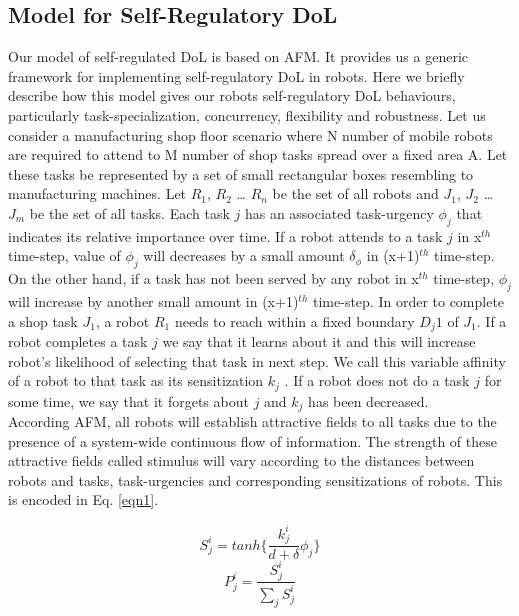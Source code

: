 \documentclass{llncs}
\begin{document}
\subsection{Model for Self-Regulatory DoL}
Our model of self-regulated DoL is based on AFM. It provides us a generic framework for implementing self-regulatory DoL in robots. Here we briefly describe how this model gives our robots self-regulatory DoL behaviours, particularly task-specialization, concurrency, flexibility and robustness.
Let us consider a manufacturing shop floor scenario where N number of mobile robots are required to attend to M number of shop tasks spread over a fixed area A. Let these tasks be represented by a set of small rectangular boxes resembling to manufacturing machines. Let $R_1$, $R_2$ … $R_n$ be the set of all robots and $J_1$, $J_2$ … $J_m$ be the set of all tasks. Each task $j$ has an associated task-urgency $\phi_j$ that indicates its relative importance over time. If a robot attends to a task $j$ in x$^{th}$ time-step, value of $\phi_j$ will decreases by a small amount $\delta_\phi$ in (x+1)$^{th}$ time-step. On the other hand, if a task has not been served by any robot in x$^{th}$ time-step,  $\phi_j$  will increase by another small amount in (x+1)$^{th}$ time-step. In order to complete a shop task $J_1$, a robot $R_1$ needs to reach within a fixed boundary $D_j1$ of $J_1$. If a robot completes a task $j$ we say that it learns about it and this will increase robot's likelihood of selecting that task in next step. We call this variable affinity of a robot to that task as its sensitization $k_j$ . If a robot does not do a task $j$ for some time, we say that it forgets about $j$ and $k_j$ has been decreased.\\
According AFM, all robots will establish attractive fields to all tasks due to the presence of a system-wide continuous flow of information. The strength of these attractive fields called stimulus will vary according to the distances between robots and tasks, task-urgencies and corresponding  sensitizations of robots. This is encoded in Eq. \ref{eqn1}.
\begin{small}
\begin{multicols}{2} 
\begin{equation}
S_{j}^{i} = tanh\{\frac{k_{j}^{i}}{d+\delta } \phi _{j}\}
\label{eqn1}
\end{equation}
\vspace*{0.25cm}
\begin{equation}
P_{j}^{i} = \frac{S_{j}^{i}}{\sum_{j}^{}S_{j}^{i}}
\label{eqn2}
\end{equation}
\end{multicols}
\end{small}
\end{document}
